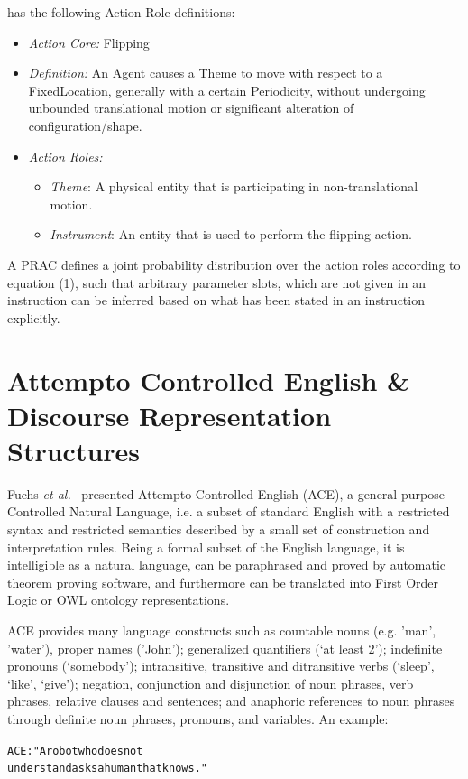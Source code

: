 \documentclass[oribibl]{llncs}
\begin{document}
has the following Action Role definitions:
\begin{itemize}
    \item \textit{Action Core:} Flipping
    \item \textit{Definition:} An Agent causes a Theme to move with respect to a FixedLocation, 
generally with a certain Periodicity, without undergoing unbounded translational 
motion or significant alteration of configuration/shape.
    \item \textit{Action Roles:}
    \begin{itemize}
        \item \textit{Theme}: A physical entity that is participating in non-translational motion.
        \item \textit{Instrument}: An entity that is used to perform the flipping action.
    \end{itemize}
\end{itemize}
A PRAC defines a joint probability distribution over the action roles
according to equation (1), such that arbitrary parameter slots, which
are not given in an instruction can be inferred based on what has been
stated in an instruction explicitly.  


\section{Attempto Controlled English \& Discourse Representation Structures}

Fuchs \textit{et al.}~\cite{fuchs:flairs2006} presented Attempto 
Controlled English (ACE), a general purpose Controlled Natural 
Language, i.e. a subset of standard English with a restricted syntax 
and restricted semantics described by a small set of construction 
and interpretation rules. Being a formal subset of the English 
language, it is intelligible as a natural language, can be 
paraphrased and proved by automatic theorem proving software, and 
furthermore can be translated into First Order Logic or OWL ontology 
representations.

ACE provides many language constructs such as countable nouns (e.g. 
'man', 'water'), proper names ('John'); generalized quantifiers (‘at 
least 2’); indefinite pronouns (‘somebody’); intransitive, 
transitive and ditransitive verbs (‘sleep’, ‘like’, ‘give’); 
negation, conjunction and disjunction of noun phrases, verb phrases, 
relative clauses and sentences; and anaphoric references to noun 
phrases through definite noun phrases, pronouns, and variables. An 
example: \begin{alltt}{\color{red} ACE:} "A robot who does not 
understand asks a human that knows."\end{alltt}
\end{document}
